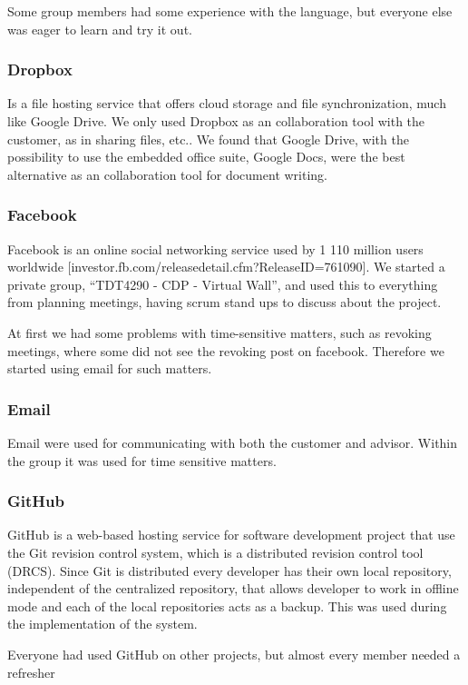 \documentclass[11pt]{book}
\begin{document}
Some group members had some experience with the language, but everyone else was eager to learn and try it out.

\subsubsection{Dropbox}
Is a file hosting service that offers cloud storage and file synchronization, much like Google Drive. We only used Dropbox as an collaboration tool with the customer, as in sharing files, etc.. We found that Google Drive, with the possibility to use the embedded office suite, Google Docs, were the best alternative as an collaboration tool for document writing.

\subsubsection{Facebook}
Facebook is an online social networking service used by 1 110 million users worldwide [investor.fb.com/releasedetail.cfm?ReleaseID=761090]. We started a private group, “TDT4290 - CDP - Virtual Wall”, and used this to everything from planning meetings, having scrum stand ups to discuss about the project. 

At first we had some problems with time-sensitive matters, such as revoking meetings, where some did not see the revoking post on facebook. Therefore we started using email for such matters.

\subsubsection{Email}
Email were used for communicating with both the customer and advisor. Within the group it was used for time sensitive matters.

\subsubsection{GitHub}
GitHub is a web-based hosting service for software development project that use the Git revision control system, which is a distributed revision control tool (DRCS). Since Git is distributed every developer has their own local repository, independent of the centralized repository, that allows developer to work in offline mode and each of the local repositories acts as a backup. This was used during the implementation of the system.

Everyone had used GitHub on other projects, but almost every member needed a refresher
\end{document}
